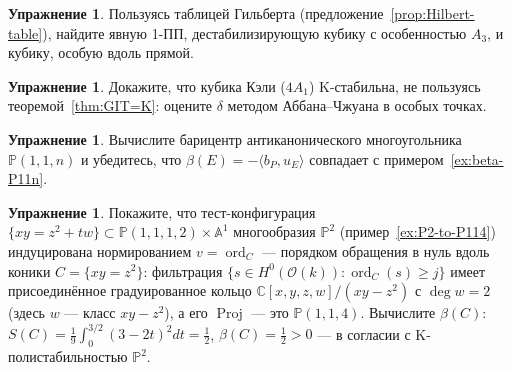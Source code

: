 \documentclass[11pt,a4paper]{article}
\theoremstyle{plain}
\theoremstyle{definition}
\newtheorem{exercise}[theorem]{Упражнение}
\theoremstyle{remark}
\renewcommand{\C}{\mathbb{C}}
\newcommand{\PP}{\mathbb{P}}
\newcommand{\A}{\mathbb{A}}
\newcommand{\cO}{\mathcal{O}}
\DeclareMathOperator{\ord}{ord}
\DeclareMathOperator{\Proj}{Proj}
\begin{document}
\begin{exercise}
Пользуясь таблицей Гильберта (предложение~\ref{prop:Hilbert-table}), найдите явную 1-ПП,
дестабилизирующую кубику с особенностью $A_3$, и кубику, особую вдоль прямой.
\end{exercise}

\begin{exercise}
Докажите, что кубика Кэли ($4A_1$) K-стабильна, не пользуясь теоремой~\ref{thm:GIT=K}: оцените
$\delta$ методом Аббана--Чжуана в особых точках.
\end{exercise}

\begin{exercise}
Вычислите барицентр антиканонического многоугольника $\PP(1,1,n)$ и убедитесь, что
$\beta(E)=-\langle b_P,u_E\rangle$ совпадает с примером~\ref{ex:beta-P11n}.
\end{exercise}

\begin{exercise}
Покажите, что тест-конфигурация $\{xy=z^2+tw\}\subset\PP(1,1,1,2)\times\A^1$ многообразия $\PP^2$
(пример~\ref{ex:P2-to-P114}) индуцирована нормированием $v=\ord_C$ --- порядком обращения в
нуль вдоль коники $C=\{xy=z^2\}$: фильтрация $\{s\in H^0(\cO(k)):\ord_C(s)\ge j\}$ имеет
присоединённое градуированное кольцо $\C[x,y,z,w]/(xy-z^2)$ с $\deg w=2$ (здесь $w$ --- класс
$xy-z^2$), а его $\Proj$ --- это $\PP(1,1,4)$. Вычислите $\beta(C)$: $S(C)=\frac19\int_0^{3/2}(3-2t)^2dt=\frac12$,
$\beta(C)=\frac12>0$ --- в согласии с K-полистабильностью $\PP^2$.
\end{exercise}
\end{document}
